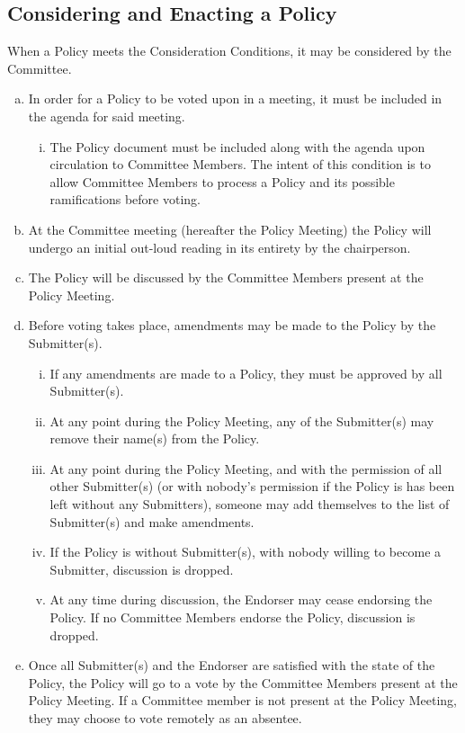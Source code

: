 \documentclass[a4paper,12pt]{article}
\begin{document}
\subsection{Considering and Enacting a Policy}

When a Policy meets the Consideration Conditions, it may be considered by the Committee.

\begin{enumerate}[a)]
	\item In order for a Policy to be voted upon in a meeting, it must be included in the agenda for said meeting.
	\begin{enumerate}[i)]
		\item The Policy document must be included along with the agenda upon circulation to Committee Members. The intent of this condition is to allow Committee Members to process a Policy and its possible ramifications before voting.
	\end{enumerate}
	\item At the Committee meeting (hereafter the Policy Meeting) the Policy will undergo an initial out-loud reading in its entirety by the chairperson.
	\item The Policy will be discussed by the Committee Members present at the Policy Meeting.
	\item Before voting takes place, amendments may be made to the Policy by the Submitter(s).
	\begin{enumerate}[i)]
		\item If any amendments are made to a Policy, they must be approved by all Submitter(s).
		\item At any point during the Policy Meeting, any of the Submitter(s) may remove their name(s) from the Policy.
		\item At any point during the Policy Meeting, and with the permission of all other Submitter(s) (or with nobody's permission if the Policy is has been left without any Submitters), someone may add themselves to the list of Submitter(s) and make amendments.
		\item If the Policy is without Submitter(s), with nobody willing to become a Submitter, discussion is dropped.
		\item At any time during discussion, the Endorser may cease endorsing the Policy. If no Committee Members endorse the Policy, discussion is dropped.
	\end{enumerate}
	\item Once all Submitter(s) and the Endorser are satisfied with the state of the Policy, the Policy will go to a vote by the Committee Members present at the Policy Meeting. If a Committee member is not present at the Policy Meeting, they may choose to vote remotely as an absentee.

\end{enumerate}
\end{document}
